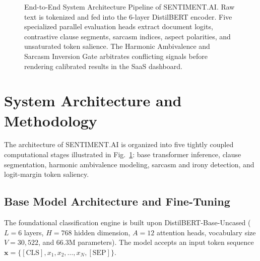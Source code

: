 \documentclass[conference]{IEEEtran}
\begin{document}
\begin{figure}[t]
\caption{End-to-End System Architecture Pipeline of SENTIMENT.AI. Raw text is tokenized and fed into the 6-layer DistilBERT encoder. Five specialized parallel evaluation heads extract document logits, contrastive clause segments, sarcasm indices, aspect polarities, and unsaturated token salience. The Harmonic Ambivalence and Sarcasm Inversion Gate arbitrates conflicting signals before rendering calibrated results in the SaaS dashboard.}
\label{fig:architecture}
\end{figure}

\section{System Architecture and Methodology}

The architecture of SENTIMENT.AI is organized into five tightly coupled computational stages illustrated in Fig.~\ref{fig:architecture}: base transformer inference, clause segmentation, harmonic ambivalence modeling, sarcasm and irony detection, and logit-margin token saliency.

\subsection{Base Model Architecture and Fine-Tuning}
The foundational classification engine is built upon DistilBERT-Base-Uncased ($L=6$ layers, $H=768$ hidden dimension, $A=12$ attention heads, vocabulary size $V=30,522$, and 66.3M parameters). The model accepts an input token sequence $\mathbf{x} = \{[\text{CLS}], x_1, x_2, \dots, x_N, [\text{SEP}]\}$. 
\end{document}

